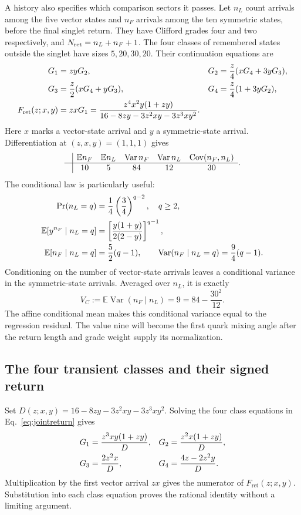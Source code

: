 \documentclass[aps,prx,onecolumn,10pt,notitlepage,nofootinbib,longbibliography]{revtex4-2}
\numberwithin{equation}{section}
\numberwithin{table}{section}
\newcommand{\EE}{\mathbb E}
\newcommand{\Var}{\operatorname{Var}}
\newcommand{\Cov}{\operatorname{Cov}}
\newcommand{\Fret}{F_{\mathrm{ret}}}
\begin{document}
A history also specifies which comparison sectors it passes. Let $n_L$ count arrivals among the five vector states and $n_F$ arrivals among the ten symmetric states, before the final singlet return. They have Clifford grades four and two respectively, and $N_{\rm ret}=n_L+n_F+1$. The four classes of remembered states outside the singlet have sizes $5,20,30,20$. Their continuation equations are
\begin{align}
 G_1&=zyG_2,&G_2&=\frac z4(xG_4+3yG_3),\notag\\
 G_3&=\frac z2(xG_4+yG_3),&G_4&=\frac z4(1+3yG_2),\notag\\
 \Fret(z;x,y)&=zxG_1
 =\frac{z^4x^2y(1+zy)}{16-8zy-3z^2xy-3z^3xy^2}.
 \label{eq:jointreturn}
\end{align}
Here $x$ marks a vector-state arrival and $y$ a symmetric-state arrival. Differentiation at $(z,x,y)=(1,1,1)$ gives
\begin{equation}
 \begin{array}{c|ccccc}
 &\EE n_F&\EE n_L&\Var n_F&\Var n_L&\Cov(n_F,n_L)\\\hline
 &10&5&84&12&30
 \end{array}.
 \label{eq:visitmoments}
\end{equation}
The conditional law is particularly useful:
\begin{align}
 \Pr(n_L=q)&=\frac14\left(\frac34\right)^{q-2},\quad q\geq2,\notag\\
 \EE[y^{n_F}\mid n_L=q]
 &=\left[\frac{y(1+y)}{2(2-y)}\right]^{q-1},\notag\\
 \EE[n_F\mid n_L=q]&=\frac52(q-1),\qquad
 \Var(n_F\mid n_L=q)=\frac94(q-1).
 \label{eq:conditional}
\end{align}
Conditioning on the number of vector-state arrivals leaves a conditional variance in the symmetric-state arrivals. Averaged over $n_L$, it is exactly
\begin{equation}
 V_C:=\EE\Var(n_F\mid n_L)=9
 =84-\frac{30^2}{12}.
 \label{eq:VC}
\end{equation}
The affine conditional mean makes this conditional variance equal to the regression residual. The value nine will become the first quark mixing angle after the return length and grade weight supply its normalization.

\subsection{The four transient classes and their signed return}

Set $D(z;x,y)=16-8zy-3z^2xy-3z^3xy^2$. Solving the four class equations in
Eq.~\eqref{eq:jointreturn} gives
\begin{align}
 G_1&=\frac{z^3xy(1+zy)}{D},&
 G_2&=\frac{z^2x(1+zy)}{D},\notag\\
 G_3&=\frac{2z^2x}{D},&
 G_4&=\frac{4z-2z^2y}{D}.
 \label{eq:classsolutions}
\end{align}
Multiplication by the first vector arrival $zx$ gives the numerator of
$\Fret(z;x,y)$. Substitution into each class equation proves the rational
identity without a limiting argument.
\end{document}
